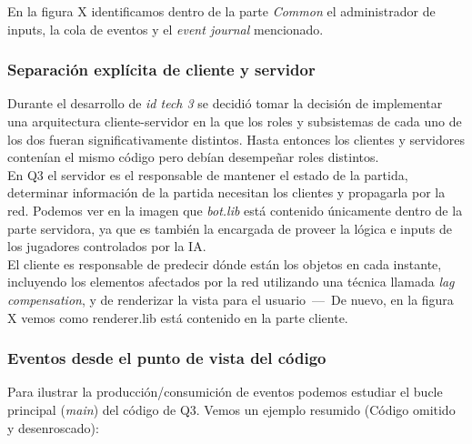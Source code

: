 \documentclass[a4paper,12pt]{report}
\begin{document}
	En la figura X identificamos dentro de la parte \textit{Common} el administrador de inputs, la cola de eventos y el \textit{event journal} mencionado.
	
	\subsubsection{Separación explícita de cliente y servidor}
	
	Durante el desarrollo de \textit{id tech 3} se decidió tomar la decisión de implementar una arquitectura cliente-servidor en la que los roles y subsistemas de cada uno de los dos fueran significativamente distintos. Hasta entonces los clientes y servidores contenían el mismo código pero debían desempeñar roles distintos.\\
	
	En Q3 el servidor es el responsable de mantener el estado de la partida, determinar información de la partida necesitan los clientes y propagarla por la red. Podemos ver en la imagen que \textit{bot.lib} está contenido únicamente dentro de la parte servidora, ya que es también la encargada de proveer la lógica e inputs de los jugadores controlados por la IA.\\
	
	El cliente es responsable de predecir dónde están los objetos en cada instante, incluyendo los elementos afectados por la red utilizando una técnica llamada \textit{lag compensation}, y de renderizar la vista para el usuario \,---\, De nuevo, en la figura X vemos como renderer.lib está contenido en la parte cliente.	\cite{architecture}\\
	
	\subsubsection{Eventos desde el punto de vista del código}
	
	Para ilustrar la producción/consumición de eventos podemos estudiar el bucle principal (\textit{main}) del código de Q3. Vemos un ejemplo resumido (Código omitido y desenroscado):
	
\end{document}
